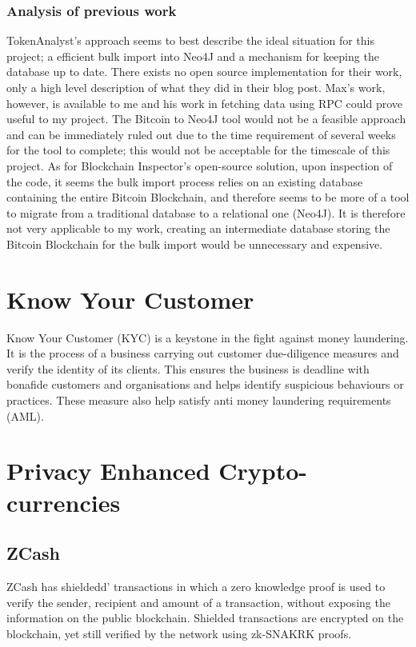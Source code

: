 \subsubsection{Analysis of previous work}
TokenAnalyst's approach seems to best describe the ideal situation for this project; a efficient bulk import into Neo4J and a mechanism for keeping the database up to date. There exists no open source implementation for their work, only a high level description of what they did in their blog post. Max's work, however, is available to me and his work in fetching data using RPC could prove useful to my project. The Bitcoin to Neo4J tool would not be a feasible approach and can be immediately ruled out due to the time requirement of several weeks for the tool to complete; this would not be acceptable for the timescale of this project. As for Blockchain Inspector's open-source solution, upon inspection of the code, it seems the bulk import process relies on an existing database containing the entire Bitcoin Blockchain, and therefore seems to be more of a tool to migrate from a traditional database to a relational one (Neo4J). It is therefore not very applicable to my work, creating an intermediate database storing the Bitcoin Blockchain for the bulk import would be unnecessary and expensive.

\section{Know Your Customer}\label{background-kyc}
Know Your Customer (KYC) is a keystone in the fight against money laundering. It is the process of a business carrying out customer due-diligence measures and verify the identity of its clients. This ensures the business is deadline with bonafide customers and organisations and helps identify suspicious behaviours or practices. These measure also help satisfy anti money laundering requirements (AML). 

\section{Privacy Enhanced Crypto-currencies}
\subsection{ZCash}\label{background-zcash}
ZCash has shieldedd' transactions in which a zero knowledge proof is used to verify the sender, recipient and amount of a transaction, without exposing the information on the public blockchain. Shielded transactions are encrypted on the blockchain, yet still verified by the network using zk-SNAKRK proofs. 

